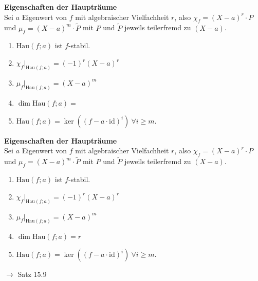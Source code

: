 \documentclass[11pt]{article}
\renewcommand{\cite}[1]{\par\bigskip\hfill{\color{gray}\tiny\(\to\) #1}}
\renewcommand{\geq}{\geqslant}
\newcommand{\id}{\mathrm{id}}
\newenvironment{field}{}{\newpage}
\newif\ifnote
\newenvironment{note}{\notetrue}{\notefalse}
\begin{document}
\begin{note}
    \begin{field}
        \textbf{Eigenschaften der Haupträume}\\
        Sei $a$ Eigenwert von $f$ mit algebraischer Vielfachheit $r$, also $\chi_f = (X-a)^r\cdot P$ und $\mu_f = (X-a)^m\cdot \tilde P$ mit $P$ und $\tilde P$ jeweils teilerfremd zu $(X-a)$.
        \begin{enumerate}[(1)]
            \item $\text{Hau}(f;a)$ ist $f$-stabil.
            \item $\chi_f\vert_{\text{Hau}(f;a)} = (-1)^r(X-a)^r$
            \item $\mu_f\vert_{\text{Hau}(f;a)} = (X-a)^m$
            \item $\dim \text{Hau}(f;a) = \phantom{r}$
            \item $\text{Hau}(f;a)= \ker((f- a\cdot \id)^i) \ \forall i \geq m$.
        \end{enumerate}
    \end{field}
    \begin{field}
        \textbf{Eigenschaften der Haupträume}\\
        Sei $a$ Eigenwert von $f$ mit algebraischer Vielfachheit $r$, also $\chi_f = (X-a)^r\cdot P$ und $\mu_f = (X-a)^m\cdot \tilde P$ mit $P$ und $\tilde P$ jeweils teilerfremd zu $(X-a)$.
        \begin{enumerate}[(1)]
            \item $\text{Hau}(f;a)$ ist $f$-stabil.
            \item $\chi_f\vert_{\text{Hau}(f;a)} = (-1)^r(X-a)^r$
            \item $\mu_f\vert_{\text{Hau}(f;a)} = (X-a)^m$
            \item $\dim \text{Hau}(f;a) = r$
            \item $\text{Hau}(f;a)= \ker((f- a\cdot \id)^i) \ \forall i \geq m$.
        \end{enumerate}
        \cite{Satz 15.9}
    \end{field}
\end{note}
\end{document}
